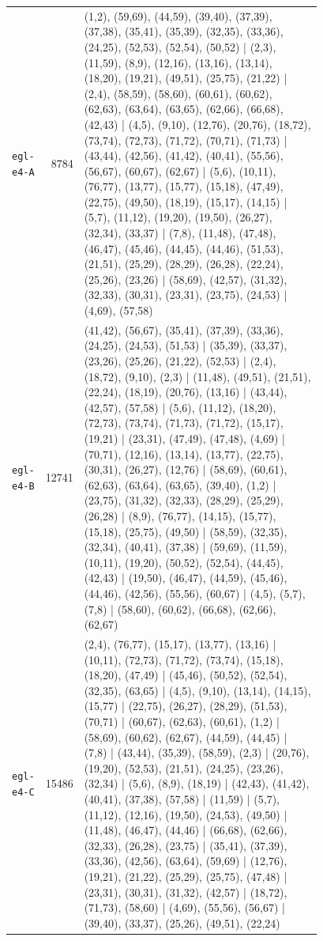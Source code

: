 \begin{landscape}
\begin{longtable}{lr>{\tiny\raggedright\arraybackslash}p{0.78\linewidth}}
\texttt{egl-e4-A} & 8784 & (1,2), (59,69), (44,59), (39,40), (37,39), (37,38), (35,41), (35,39), (32,35), (33,36), (24,25), (52,53), (52,54), (50,52) | (2,3), (11,59), (8,9), (12,16), (13,16), (13,14), (18,20), (19,21), (49,51), (25,75), (21,22) | (2,4), (58,59), (58,60), (60,61), (60,62), (62,63), (63,64), (63,65), (62,66), (66,68), (42,43) | (4,5), (9,10), (12,76), (20,76), (18,72), (73,74), (72,73), (71,72), (70,71), (71,73) | (43,44), (42,56), (41,42), (40,41), (55,56), (56,67), (60,67), (62,67) | (5,6), (10,11), (76,77), (13,77), (15,77), (15,18), (47,49), (22,75), (49,50), (18,19), (15,17), (14,15) | (5,7), (11,12), (19,20), (19,50), (26,27), (32,34), (33,37) | (7,8), (11,48), (47,48), (46,47), (45,46), (44,45), (44,46), (51,53), (21,51), (25,29), (28,29), (26,28), (22,24), (25,26), (23,26) | (58,69), (42,57), (31,32), (32,33), (30,31), (23,31), (23,75), (24,53) | (4,69), (57,58) \\[2pt]
\texttt{egl-e4-B} & 12741 & (41,42), (56,67), (35,41), (37,39), (33,36), (24,25), (24,53), (51,53) | (35,39), (33,37), (23,26), (25,26), (21,22), (52,53) | (2,4), (18,72), (9,10), (2,3) | (11,48), (49,51), (21,51), (22,24), (18,19), (20,76), (13,16) | (43,44), (42,57), (57,58) | (5,6), (11,12), (18,20), (72,73), (73,74), (71,73), (71,72), (15,17), (19,21) | (23,31), (47,49), (47,48), (4,69) | (70,71), (12,16), (13,14), (13,77), (22,75), (30,31), (26,27), (12,76) | (58,69), (60,61), (62,63), (63,64), (63,65), (39,40), (1,2) | (23,75), (31,32), (32,33), (28,29), (25,29), (26,28) | (8,9), (76,77), (14,15), (15,77), (15,18), (25,75), (49,50) | (58,59), (32,35), (32,34), (40,41), (37,38) | (59,69), (11,59), (10,11), (19,20), (50,52), (52,54), (44,45), (42,43) | (19,50), (46,47), (44,59), (45,46), (44,46), (42,56), (55,56), (60,67) | (4,5), (5,7), (7,8) | (58,60), (60,62), (66,68), (62,66), (62,67) \\[2pt]
\texttt{egl-e4-C} & 15486 & (2,4), (76,77), (15,17), (13,77), (13,16) | (10,11), (72,73), (71,72), (73,74), (15,18), (18,20), (47,49) | (45,46), (50,52), (52,54), (32,35), (63,65) | (4,5), (9,10), (13,14), (14,15), (15,77) | (22,75), (26,27), (28,29), (51,53), (70,71) | (60,67), (62,63), (60,61), (1,2) | (58,69), (60,62), (62,67), (44,59), (44,45) | (7,8) | (43,44), (35,39), (58,59), (2,3) | (20,76), (19,20), (52,53), (21,51), (24,25), (23,26), (32,34) | (5,6), (8,9), (18,19) | (42,43), (41,42), (40,41), (37,38), (57,58) | (11,59) | (5,7), (11,12), (12,16), (19,50), (24,53), (49,50) | (11,48), (46,47), (44,46) | (66,68), (62,66), (32,33), (26,28), (23,75) | (35,41), (37,39), (33,36), (42,56), (63,64), (59,69) | (12,76), (19,21), (21,22), (25,29), (25,75), (47,48) | (23,31), (30,31), (31,32), (42,57) | (18,72), (71,73), (58,60) | (4,69), (55,56), (56,67) | (39,40), (33,37), (25,26), (49,51), (22,24) \\[2pt]

\end{longtable}
\end{landscape}
